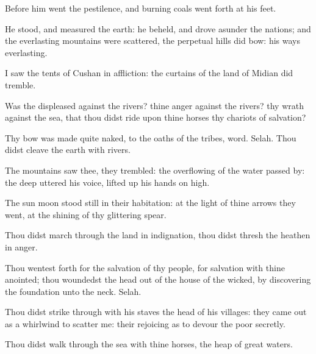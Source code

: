{Before him
went the
pestilence, and burning
coals went
forth at his
feet.

He
stood, and
measured the
earth: he
beheld, and drove
asunder the
nations; and the
everlasting
mountains were
scattered, the
perpetual
hills did
bow: his
ways
{}
everlasting.

I
saw the
tents of
Cushan in
affliction:
{} the
curtains of the
land of
Midian did
tremble.

Was the
{}
displeased against the
rivers?
{} thine
anger against the
rivers?
{} thy
wrath against the
sea, that thou didst
ride upon thine
horses
{} thy
chariots of
salvation?

Thy
bow was made
quite
naked,
{} to the
oaths of the
tribes,
{}
word.
Selah. Thou didst
cleave the
earth with
rivers.

The
mountains
saw thee,
{} they
trembled: the
overflowing of the
water passed
by: the
deep
uttered his
voice,
{} lifted
up his
hands on
high.

The
sun
{}
moon stood
still in their
habitation: at the
light of thine
arrows they
went,
{} at the
shining of thy
glittering
spear.

Thou didst march
through the
land in
indignation, thou didst
thresh the
heathen in
anger.

Thou wentest
forth for the
salvation of thy
people,
{} for
salvation with thine
anointed; thou
woundedst the
head out of the
house of the
wicked, by
discovering the
foundation unto the
neck.
Selah.

Thou didst strike
through with his
staves the
head of his
villages: they came out as a
whirlwind to
scatter me: their
rejoicing
{} as to
devour the
poor
secretly.

Thou didst
walk through the
sea with thine
horses,
{} the
heap of
great
waters.


}
